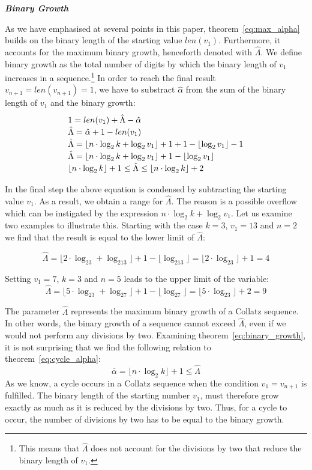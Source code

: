 \documentclass{SciPress_2015}
\renewcommand{\subsection}[1]{\textit{\textbf{#1}}}
\begin{document}
\subsection{Binary Growth}
\par\noindent
As we have emphasised at several points in this paper, theorem~\ref{eq:max_alpha} builds on the binary length of the starting value $len(v_1)$. Furthermore, it accounts for the maximum binary growth, henceforth denoted with $\hat\Lambda$. We define binary growth as the total number of digits by which the binary length of $v_1$ increases in a sequence.\footnote{This means that $\hat\Lambda$ does not account for the divisions by two that reduce the binary length of $v_1$.} In order to reach the final result $v_{n+1}=len(v_{n+1})=1$, we have to substract $\hat\alpha$ from the sum of the binary length of $v_1$ and the binary growth:
\begin{equation}
\label{eq:binary_growth}
\def\arraystretch{1.2}\begin{array}{l}
1=len(v_1)+\hat\Lambda-\hat\alpha\\
\hat\Lambda=\hat\alpha+1-len(v_1)\\
\hat\Lambda=\lfloor n\cdot\log_2k+\log_2v_1\rfloor+1+1-\lfloor\log_2v_1\rfloor-1\\
\hat\Lambda=\lfloor n\cdot\log_2k+\log_2v_1\rfloor+1-\lfloor\log_2v_1\rfloor\\
\lfloor n\cdot\log_2k\rfloor+1\le\hat\Lambda\le\lfloor n\cdot\log_2k\rfloor+2
\end{array}
\end{equation}

In the final step the above equation is condensed by subtracting the starting value $v_1$. As a result, we obtain a range for $\hat\Lambda$. The reason is a possible overflow which can be instigated by the expression $n\cdot\log_2k+\log_2v_1$. Let us examine two examples to illustrate this. Starting with the case $k=3$, $v_1=13$ and $n=2$ we find that the result is equal to the lower limit of $\hat\Lambda$:

\[
\hat\Lambda=\lfloor2\cdot\log_23+\log_213\rfloor+1-\lfloor\log_213\rfloor=\lfloor2\cdot\log_23\rfloor+1=4
\]

\par\medskip
Setting $v_1=7$, $k=3$ and $n=5$ leads to the upper limit of the variable:
\[
\hat\Lambda=\lfloor5\cdot\log_23+\log_27\rfloor+1-\lfloor\log_27\rfloor=\lfloor5\cdot\log_23\rfloor+2=9
\]

The parameter $\hat\Lambda$ represents the maximum binary growth of a Collatz sequence. In other words, the binary growth of a sequence cannot exceed $\hat\Lambda$, even if we would not perform any divisions by two. Examining theorem~\ref{eq:binary_growth}, it is not surprising that we find the following relation to theorem~\ref{eq:cycle_alpha}:
\[
\bar\alpha=\lfloor n\cdot\log_2k\rfloor+1\le\hat\Lambda
\]
As we know, a cycle occurs in a Collatz sequence when the condition $v_1=v_{n+1}$ is fulfilled. The binary length of the starting number $v_1$, must therefore grow exactly as much as it is reduced by the divisions by two. Thus, for a cycle to occur, the number of divisions by two has to be equal to the binary growth.
\end{document}
